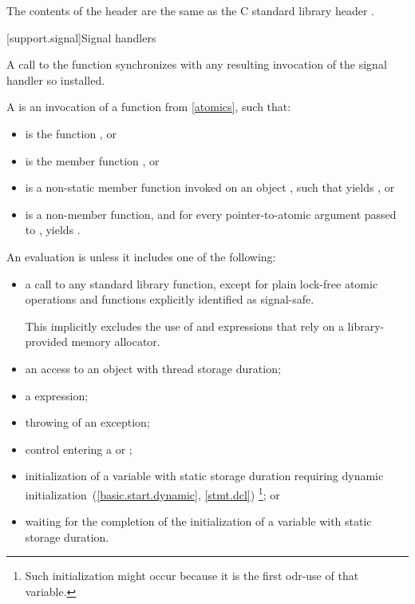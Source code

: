 \pnum
{}%
The contents of the header  are the same as the C
standard library header .

[support.signal]{Signal handlers}

\pnum
A call to the function  synchronizes with any resulting
invocation of the signal handler so installed.

\pnum
A  is
an invocation of a function  from \ref{atomics},
such that:

\begin{itemize}
\item
{} is the function , or

\item
{} is the member function , or

\item
{} is a non-static member function invoked on an object ,
such that  yields , or

\item
{} is a non-member function, and
for every pointer-to-atomic argument  passed to ,
 yields .
\end{itemize}

\pnum
{}%
An evaluation is  unless it includes one of the following:

\begin{itemize}
\item
a call to any standard library function,
except for plain lock-free atomic operations and
functions explicitly identified as signal-safe.
\begin{note}
This implicitly excludes the use of  and  expressions
that rely on a library-provided memory allocator.
\end{note}

\item
an access to an object with thread storage duration;

\item
a  expression;

\item
throwing of an exception;

\item
control entering a  or ;

\item
initialization of a variable with static storage duration
requiring dynamic initialization~(\ref{basic.start.dynamic}, \ref{stmt.dcl})%
\footnote{Such initialization might occur because it is the first odr-use of that variable.}; or

\item
waiting for the completion of the initialization of a variable with static storage duration.
\end{itemize}


